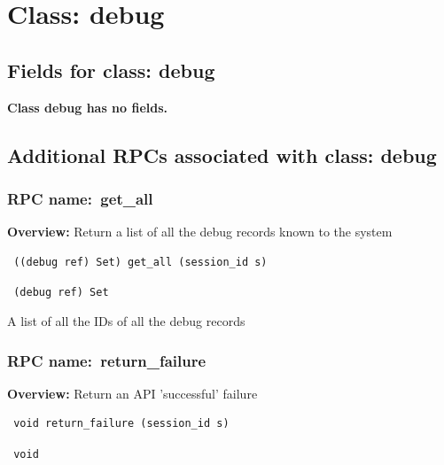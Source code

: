 \vspace{1cm}
\newpage
\section{Class: debug}
\subsection{Fields for class: debug}
{\bf Class debug has no fields.}
\subsection{Additional RPCs associated with class: debug}
\subsubsection{RPC name:~get\_all}

{\bf Overview:} 
Return a list of all the debug records known to the system

\begin{verbatim} ((debug ref) Set) get_all (session_id s)\end{verbatim}


\vspace{0.3cm}

{\tt 
(debug ref) Set
}


A list of all the IDs of all the debug records
\vspace{0.3cm}
\vspace{0.3cm}
\vspace{0.3cm}
\subsubsection{RPC name:~return\_failure}

{\bf Overview:} 
Return an API 'successful' failure

\begin{verbatim} void return_failure (session_id s)\end{verbatim}


\vspace{0.3cm}

{\tt 
void
}



\vspace{0.3cm}
\vspace{0.3cm}
\vspace{0.3cm}
